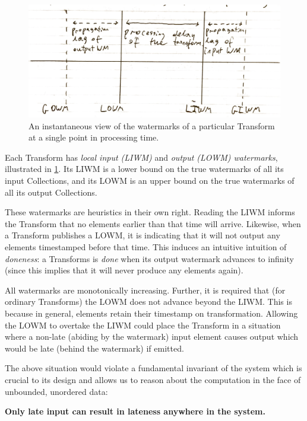 \begin{figure}[t]
	\includegraphics[width=\textwidth]{images/temp/lwm-transform-instantaneous}
	\caption{An instantaneous view of the watermarks of a particular Transform at a single point in processing time.}
	\label{fig:impl:lwm-instantaneous}
\end{figure}

Each Transform has \emph{local input (LIWM)} and \emph{output (LOWM) watermarks}, illustrated in \cref{fig:impl:lwm-instantaneous}.
Its LIWM is a lower bound on the true watermarks of all its input Collections, and its LOWM is an upper bound on the true watermarks of all its output Collections.

These watermarks are heuristics in their own right.
Reading the LIWM informs the Transform that no elements earlier than that time will arrive.
Likewise, when a Transform publishes a LOWM, it is indicating that it will not output any elements timestamped before that time. This induces an intuitive intuition of \emph{doneness}: a Transforms is \emph{done} when its output watermark advances to infinity (since this implies that it will never produce any elements again).

All watermarks are monotonically increasing.
Further, it is required that (for ordinary Transforms) the LOWM does not advance beyond the LIWM.
This is because in general, elements retain their timestamp on transformation.
Allowing the LOWM to overtake the LIWM could place the Transform in a situation where a non-late (abiding by the watermark) input element causes output which would be late (behind the watermark) if emitted.

The above situation would violate a fundamental invariant of the system which is crucial to its design and allows us to reason about the computation in the face of unbounded, unordered data:

\textbf{Only late input can result in lateness anywhere in the system.}

